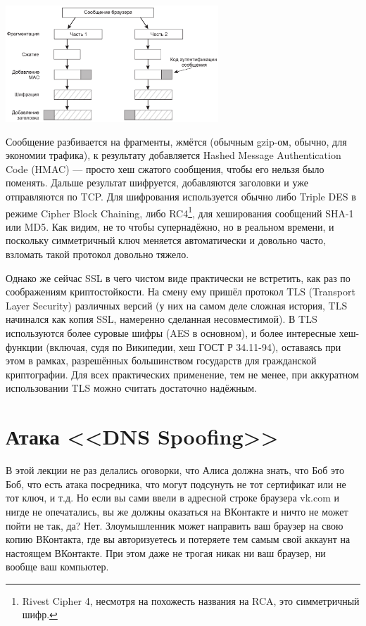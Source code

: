 \documentclass{../mcstext}
\begin{document}
\begin{center}
    \includegraphics[width=0.6\textwidth]{sslCommunication.png}
\end{center}

Сообщение разбивается на фрагменты, жмётся (обычным gzip-ом, обычно, для экономии трафика), к результату добавляется Hashed Message Authentication Code (HMAC) --- просто хеш сжатого сообщения, чтобы его нельзя было поменять. Дальше результат шифруется, добавляются заголовки и уже отправляются по TCP. Для шифрования используется обычно либо Triple DES в режиме Cipher Block Chaining, либо RC4\footnote{Rivest Cipher 4, несмотря на похожесть названия на RCA, это симметричный шифр.}, для хеширования сообщений SHA-1 или MD5. Как видим, не то чтобы супернадёжно, но в реальном времени, и поскольку симметричный ключ меняется автоматически и довольно часто, взломать такой протокол довольно тяжело.

Однако же сейчас SSL в чего чистом виде практически не встретить, как раз по соображениям криптостойкости. На смену ему пришёл протокол TLS (Transport Layer Security) различных версий (у них на самом деле сложная история, TLS начинался как копия SSL, намеренно сделанная несовместимой). В TLS используются более суровые шифры (AES в основном), и более интересные хеш-функции (включая, судя по Википедии, хеш ГОСТ Р 34.11-94), оставаясь при этом в рамках, разрешённых большинством государств для гражданской криптографии. Для всех практических применение, тем не менее, при аккуратном использовании TLS можно считать достаточно надёжным.

\section{Атака <<DNS Spoofing>>}

В этой лекции не раз делались оговорки, что Алиса должна знать, что Боб это Боб, что есть атака посредника, что могут подсунуть не тот сертификат или не тот ключ, и т.д. Но если вы сами ввели в адресной строке браузера vk.com и нигде не опечатались, вы же должны оказаться на ВКонтакте и ничто не может пойти не так, да? Нет. Злоумышленник может направить ваш браузер на свою копию ВКонтакта, где вы авторизуетесь и потеряете тем самым свой аккаунт на настоящем ВКонтакте. При этом даже не трогая никак ни ваш браузер, ни вообще ваш компьютер. 
\end{document}
